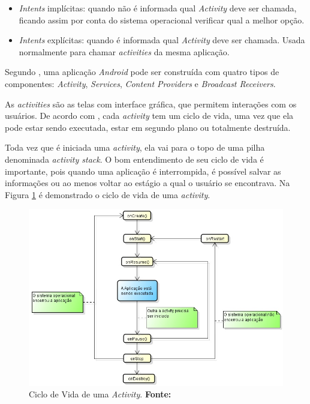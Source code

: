 	\begin{itemize}
	  
	  \item \textit{Intents} implícitas: quando não é informada qual
	  \textit{Activity} deve ser chamada, ficando assim por conta do sistema
	  operacional verificar qual a melhor opção.
	  
	  \item \textit{Intents} explícitas: quando é informada qual
	  \textit{Activity} deve ser chamada. Usada normalmente para chamar
	  \textit{activities} da mesma aplicação.
	  
	\end{itemize}
	
	\par Segundo , uma aplicação \textit{Android} pode ser
construída com quatro tipos de componentes: \textit{Activity},
\textit{Services}, \textit{Content Providers} e \textit{Broadcast Receivers}.

	\par As \textit{activities} são as telas com interface gráfica, que permitem
interações com os usuários. De acordo com , cada
\textit{activity} tem um ciclo de vida, uma vez que ela pode estar sendo
executada, estar em segundo plano ou totalmente destruída.

	\par Toda vez que é iniciada uma \textit{activity}, ela vai para o topo de uma
pilha denominada \textit{activity stack}. O bom entendimento de seu ciclo de vida é
importante, pois quando uma aplicação é interrompida, é possível salvar as
informações ou ao menos voltar ao estágio a qual o usuário se encontrava. Na
Figura \ref{fig:qt1} é demonstrado o ciclo de vida de uma
\textit{activity}.

\begin{figure}[h!]
	\centerline{\includegraphics[scale=0.5]{./imagens/1_q_teorico/qt1.png}}
	\caption[Ciclo de Vida de uma \textit{Activity} ]{Ciclo de Vida de uma
	\textit{Activity}.
	 \textbf{Fonte:}}
	\label{fig:qt1}
\end{figure}

